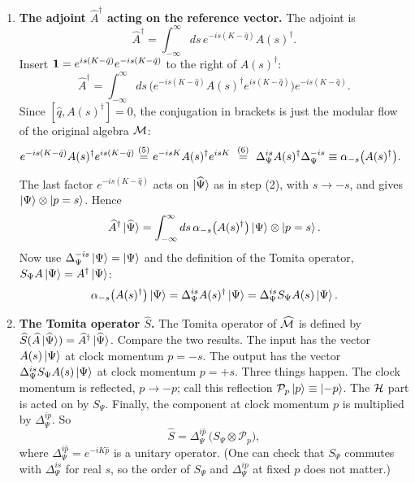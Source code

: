 \begin{keyresult}
\begin{enumerate}[leftmargin=*]
\item \textbf{The adjoint $\widehat A^\dagger$ acting on the reference vector.}
The adjoint is
\[
\widehat A^\dagger = \int_{-\infty}^\infty ds \, e^{-is(K - \hat q)} A(s)^\dagger .
\]
Insert $\mathbf{1}=e^{is(K-\hat q)}e^{-is(K-\hat q)}$ to the right of $A(s)^\dagger$:
\[
\widehat A^\dagger = \int_{-\infty}^\infty ds \, \Big( e^{-is(K - \hat q)} A(s)^\dagger e^{is(K - \hat q)} \Big) e^{-is(K - \hat q)} .
\]
Since $[\hat q, A(s)^\dagger] = 0$, the conjugation in brackets is just the modular flow of the original algebra $\mathcal{M}$:
\begin{align}
e^{-is(K - \hat q)} A(s)^\dagger e^{is(K - \hat q)}
&\overset{(5)}{=} e^{-is K} A(s)^\dagger e^{is K}
\ \overset{(6)}{=}\ \Delta_\Psi^{is} A(s)^\dagger \Delta_\Psi^{-is} \equiv \alpha_{-s}\big(A(s)^\dagger\big) . \notag
\end{align}
\quad
{}

The last factor $e^{-is(K-\hat q)}$ acts on $\ket{\widehat\Psi}$ as in step (2), with $s\to-s$, and gives $\ket\Psi\otimes\ket{p=s}$. Hence
\[
\widehat A^\dagger \ket{\widehat\Psi} = \int_{-\infty}^\infty ds \, \alpha_{-s}\big(A(s)^\dagger\big)\ket\Psi \otimes \ket{p = s} .
\]
Now use $\Delta_\Psi^{-is}\ket\Psi = \ket\Psi$ and the definition of the Tomita operator, $S_\Psi A\ket\Psi = A^\dagger\ket\Psi$:
\[
\alpha_{-s}\big(A(s)^\dagger\big)\ket\Psi = \Delta_\Psi^{is} A(s)^\dagger\ket\Psi = \Delta_\Psi^{is} S_\Psi A(s)\ket\Psi .
\]

\item \textbf{The Tomita operator $\widehat S$.}
The Tomita operator of $\widehat{\mathcal{M}}$ is defined by $\widehat S(\widehat A\ket{\widehat\Psi}) = \widehat A^\dagger\ket{\widehat\Psi}$. Compare the two results. The input has the vector $A(s)\ket\Psi$ at clock momentum $p=-s$. The output has the vector $\Delta_\Psi^{is}S_\Psi A(s)\ket\Psi$ at clock momentum $p=+s$. Three things happen. The clock momentum is reflected, $p\to-p$; call this reflection $\mathcal{P}_p \ket{p} \equiv \ket{-p}$. The $\mathcal{H}$ part is acted on by $S_\Psi$. Finally, the component at clock momentum $p$ is multiplied by $\Delta_\Psi^{ip}$. So
\[
\widehat S = \Delta_\Psi^{i\hat p}\,\big(S_\Psi \otimes \mathcal{P}_p\big) ,
\]
where $\Delta_\Psi^{i\hat p}=e^{-iK\hat p}$ is a unitary operator. (One can check that $S_\Psi$ commutes with $\Delta_\Psi^{is}$ for real $s$, so the order of $S_\Psi$ and $\Delta_\Psi^{ip}$ at fixed $p$ does not matter.)


\end{enumerate}
\end{keyresult}
